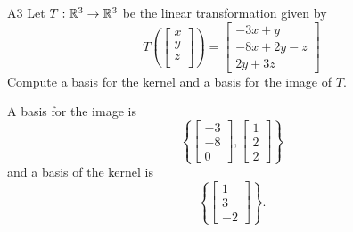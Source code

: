 \begin{problem}{A3}
Let $T: \mathbb{R}^3\rightarrow \mathbb{R}^3$ be the linear transformation given by $$T\left(\begin{bmatrix} x \\ y \\ z \\  \end{bmatrix} \right) = \begin{bmatrix} -3x+y \\ -8x+2y-z \\ 2y+3z \end{bmatrix}$$
Compute a basis for the kernel and a basis for the image of $T$.
\end{problem}
\begin{solution}
A basis for the image is  $$\left\{ \begin{bmatrix} -3 \\ -8 \\ 0 \end{bmatrix}, \begin{bmatrix} 1 \\ 2 \\ 2 \end{bmatrix} \right\}$$
and a basis of the kernel is 
$$\left\{\begin{bmatrix} 1 \\ 3 \\ -2 \end{bmatrix} \right\}.$$
\end{solution}


